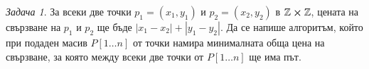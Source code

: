 \documentclass{article}
\theoremstyle{definition}
\theoremstyle{plain}
\theoremstyle{remark}
\newtheorem{problem}{Задача}
\theoremstyle{definition}
\begin{document}
\begin{problem}
За всеки две точки $p_1 =(x_1, y_1)$ и $p_2 = (x_2, y_2)$ в $\mathbb{Z} \cross \mathbb{Z}$, цената на свързване на $p_1$ и $p_2$ ще бъде $|x_1 - x_2| + |y_1 - y_2|$.
Да се напише алгоритъм, който при подаден масив $P[1 \dots n]$ от точки намира минималната обща цена на свързване, за която между всеки две точки от $P[1 \dots n]$ ще има път.
\end{problem}
\end{document}
